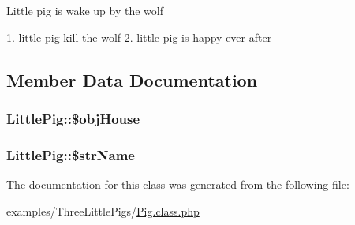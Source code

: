 Little pig is wake up by the wolf

1. little pig kill the wolf 2. little pig is happy ever after 

\subsection{Member Data Documentation}
\hypertarget{class_little_pig_a04c1809050a47bf870e73c05276b3e2}{
\subsubsection[{\$objHouse}]{\setlength{\rightskip}{0pt plus 5cm}LittlePig::\$objHouse}}
\label{class_little_pig_a04c1809050a47bf870e73c05276b3e2}


\hypertarget{class_little_pig_c52ffef44781a732c80f1e57904ab164}{
\subsubsection[{\$strName}]{\setlength{\rightskip}{0pt plus 5cm}LittlePig::\$strName}}
\label{class_little_pig_c52ffef44781a732c80f1e57904ab164}




The documentation for this class was generated from the following file:\begin{CompactItemize}
\item 
examples/ThreeLittlePigs/\hyperlink{_pig_8class_8php}{Pig.class.php}\end{CompactItemize}

